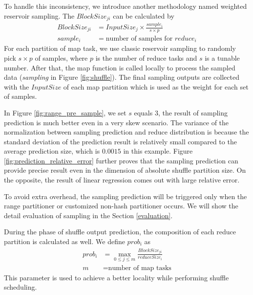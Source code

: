 To handle this inconsistency, we introduce another methodology named weighted reservoir sampling. The $BlockSize_{ji}$ can be calculated by
\begin{equation}
\label{equationsample}
\begin{aligned}
	BlockSize_{ji} &= {{InputSize_j \times \frac{sample_i}{s \times p}}} \\
	sample_i &= \text{number of samples for $reduce_i$}
\end{aligned}
\end{equation}
For each partition of map task, we use classic reservoir sampling to randomly pick $s \times p$ of samples, where $p$ is the number of reduce tasks and $s$ is a tunable number. After that, the map function is called locally to process the sampled data (\textit{sampling} in Figure \ref{fig:shuffle}). The final sampling outputs are collected with the $InputSize$ of each map partition which is used as the weight for each set of samples.

In Figure \ref{fig:range_pre_sample}, we set $s$ equals $3$, the result of sampling prediction is much better even in a very skew scenario. The variance of the normalization between sampling prediction and reduce distribution is because the standard deviation of the prediction result is relatively small compared to the average prediction size, which is $0.0015$ in this example. Figure \ref{fig:prediction_relative_error} further proves that the sampling prediction can provide precise result even in the dimension of absolute shuffle partition size. On the opposite, the result of linear regression comes out with large relative error.

To avoid extra overhead, the sampling prediction will be triggered only when the range partitioner or customized non-hash partitioner occurs. We will show the detail evaluation of sampling in the Section \ref{evaluation}.

During the phase of shuffle output prediction, the composition of each reduce partition is calculated as well. We define $prob_i$ as
\begin{equation}
\label{equationprob}
\begin{aligned}
	prob_i &= \max_{0 \leq j \leq m} \frac{BlockSize_{ji}}{reduceSize_i} \\
    m &= \text{number of map tasks}
\end{aligned}
\end{equation}
This parameter is used to achieve a better locality while performing shuffle scheduling.

